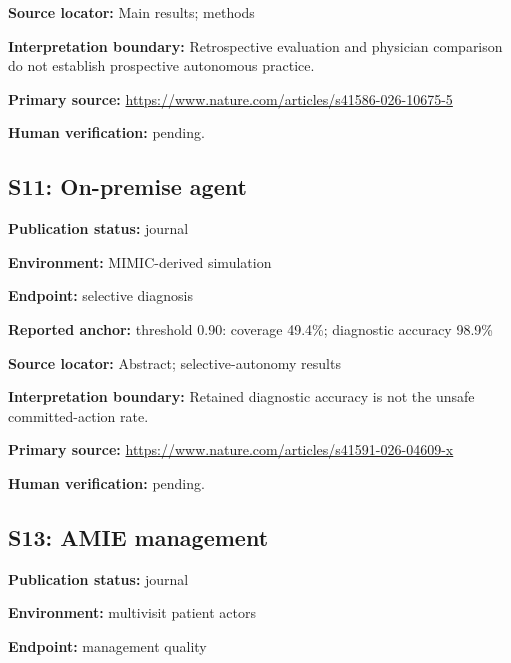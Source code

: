 \documentclass[journal,onecolumn,10pt]{IEEEtran}
\begin{document}
\noindent\textbf{Source locator:} Main results; methods\par

\noindent\textbf{Interpretation boundary:} Retrospective evaluation and physician comparison do not establish prospective autonomous practice.\par

\noindent\textbf{Primary source:} \url{https://www.nature.com/articles/s41586-026-10675-5}\par
\noindent\textbf{Human verification:} pending.

\subsection*{S11: On-premise agent}

\noindent\textbf{Publication status:} journal\par

\noindent\textbf{Environment:} MIMIC-derived simulation\par

\noindent\textbf{Endpoint:} selective diagnosis\par

\noindent\textbf{Reported anchor:} threshold 0.90: coverage 49.4\%; diagnostic accuracy 98.9\%\par

\noindent\textbf{Source locator:} Abstract; selective-autonomy results\par

\noindent\textbf{Interpretation boundary:} Retained diagnostic accuracy is not the unsafe committed-action rate.\par

\noindent\textbf{Primary source:} \url{https://www.nature.com/articles/s41591-026-04609-x}\par
\noindent\textbf{Human verification:} pending.

\subsection*{S13: AMIE management}

\noindent\textbf{Publication status:} journal\par

\noindent\textbf{Environment:} multivisit patient actors\par

\noindent\textbf{Endpoint:} management quality\par
\end{document}

